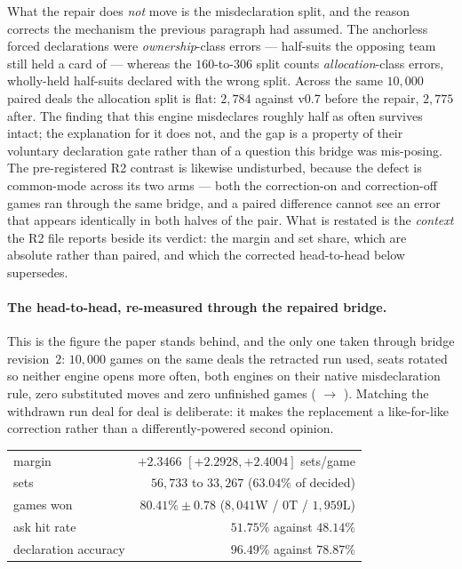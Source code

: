 \documentclass[11pt,a4paper]{article}
\begin{document}
What the repair does \emph{not} move is the misdeclaration split, and the
reason corrects the mechanism the previous paragraph had assumed. The
anchorless forced declarations were \emph{ownership}-class errors ---
half-suits the opposing team still held a card of --- whereas the
$160$-to-$306$ split counts \emph{allocation}-class errors, wholly-held
half-suits declared with the wrong split. Across the same $10{,}000$ paired
deals the allocation split is flat: $2{,}784$ against v0.7 before the
repair, $2{,}775$ after. The finding that this engine misdeclares roughly
half as often survives intact; the explanation for it does not, and the gap
is a property of their voluntary declaration gate rather than of a question
this bridge was mis-posing. The pre-registered R2 contrast is likewise
undisturbed,
because the defect is common-mode across its two arms --- both the
correction-on and correction-off games ran through the same bridge, and a
paired difference cannot see an error that appears identically in both
halves of the pair. What is restated is the \emph{context} the R2 file
reports beside its verdict: the margin and set share, which are absolute
rather than paired, and which the corrected head-to-head below supersedes.

\paragraph{The head-to-head, re-measured through the repaired bridge.}
\label{sec:headtohead}
This
is the figure the paper stands behind, and the only one taken through bridge
revision~2: $10{,}000$ games on the same deals the retracted run used, seats
rotated so neither engine opens more often, both engines on their native
misdeclaration rule, zero substituted moves and zero unfinished games
( $\rightarrow$ ).
Matching the withdrawn run deal for deal is deliberate: it makes the
replacement a like-for-like correction rather than a differently-powered
second opinion.

\begin{center}
\begin{tabular}{lr}
\toprule
margin & $\mathbf{+2.3466}$ $[+2.2928, +2.4004]$ sets/game \\
sets & $56{,}733$ to $33{,}267$ ($63.04\%$ of decided) \\
games won & $80.41\% \pm 0.78$ ($8{,}041$W / $0$T / $1{,}959$L) \\
ask hit rate & $51.75\%$ against $48.14\%$ \\
declaration accuracy & $\mathbf{96.49\%}$ against $\mathbf{78.87\%}$ \\
\bottomrule
\end{tabular}
\end{center}
\end{document}
